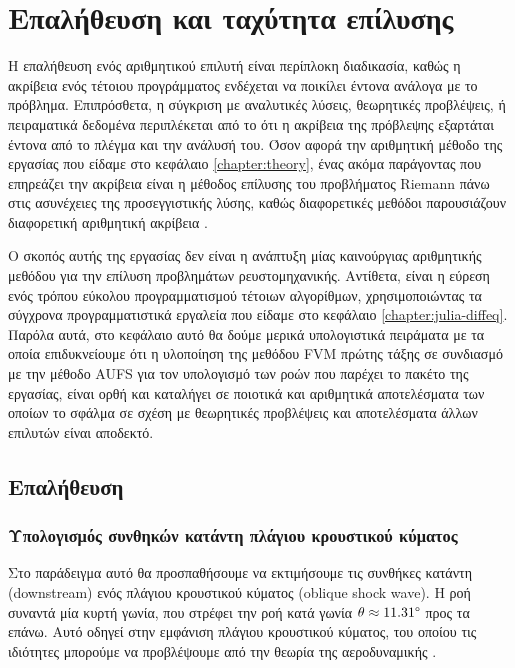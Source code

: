\chapter{Επαλήθευση και ταχύτητα επίλυσης}
\label{chapter:results}

Η επαλήθευση ενός αριθμητικού επιλυτή είναι περίπλοκη διαδικασία, καθώς η ακρίβεια ενός τέτοιου προγράμματος ενδέχεται να ποικίλει έντονα ανάλογα με το πρόβλημα.
Επιπρόσθετα, η σύγκριση με αναλυτικές λύσεις, θεωρητικές προβλέψεις, ή πειραματικά δεδομένα περιπλέκεται από το ότι η ακρίβεια της πρόβλεψης εξαρτάται έντονα από το πλέγμα και την ανάλυσή του.
Όσον αφορά την αριθμητική μέθοδο της εργασίας που είδαμε στο κεφάλαιο \ref{chapter:theory}, ένας ακόμα παράγοντας που επηρεάζει την ακρίβεια είναι η μέθοδος επίλυσης του προβλήματος Riemann πάνω στις ασυνέχειες της προσεγγιστικής λύσης, καθώς διαφορετικές μεθόδοι παρουσιάζουν διαφορετική αριθμητική ακρίβεια \cite{Knight2006, Toro2012}.

Ο σκοπός αυτής της εργασίας δεν είναι η ανάπτυξη μίας καινούργιας αριθμητικής μεθόδου για την επίλυση προβλημάτων ρευστομηχανικής.
Αντίθετα, είναι η εύρεση ενός τρόπου εύκολου προγραμματισμού τέτοιων αλγορίθμων, χρησιμοποιώντας τα σύγχρονα προγραμματιστικά εργαλεία που είδαμε στο κεφάλαιο \ref{chapter:julia-diffeq}.
Παρόλα αυτά, στο κεφάλαιο αυτό θα δούμε μερικά υπολογιστικά πειράματα με τα οποία επιδυκνείουμε ότι η υλοποίηση της μεθόδου FVM πρώτης τάξης σε συνδιασμό με την μέθοδο AUFS για τον υπολογισμό των ροών που παρέχει το πακέτο της εργασίας, είναι ορθή και καταλήγει σε ποιοτικά και αριθμητικά αποτελέσματα των οποίων το σφάλμα σε σχέση με θεωρητικές προβλέψεις και αποτελέσματα άλλων επιλυτών είναι αποδεκτό.

\section{Επαλήθευση}

\subsection{Υπολογισμός συνθηκών κατάντη πλάγιου κρουστικού κύματος}

Στο παράδειγμα αυτό θα προσπαθήσουμε να εκτιμήσουμε τις συνθήκες κατάντη (downstream) ενός πλάγιου κρουστικού κύματος (oblique shock wave).
Η ροή συναντά μία κυρτή γωνία, που στρέφει την ροή κατά γωνία $\theta \approx 11.31 \degree$ προς τα επάνω.
Αυτό οδηγεί στην εμφάνιση πλάγιου κρουστικού κύματος, του οποίου τις ιδιότητες μπορούμε να προβλέψουμε από την θεωρία της αεροδυναμικής \cite{Anderson2003}.

